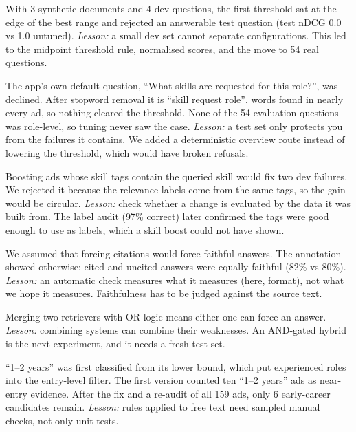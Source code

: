 \begin{description}[leftmargin=0pt]
  \item[Tuning on toy data overfits.] With 3 synthetic documents and 4 dev questions, the first threshold sat at the edge of the best range and rejected an answerable test question (test nDCG 0.0 vs 1.0 untuned). \emph{Lesson:} a small dev set cannot separate configurations. This led to the midpoint threshold rule, normalised scores, and the move to 54 real questions.
  \item[Generic questions were refused.] The app's own default question, ``What skills are requested for this role?'', was declined. After stopword removal it is ``skill request role'', words found in nearly every ad, so nothing cleared the threshold. None of the 54 evaluation questions was role-level, so tuning never saw the case. \emph{Lesson:} a test set only protects you from the failures it contains. We added a deterministic overview route instead of lowering the threshold, which would have broken refusals.
  \item[A fix that would have inflated our own scores.] Boosting ads whose skill tags contain the queried skill would fix two dev failures. We rejected it because the relevance labels come from the same tags, so the gain would be circular. \emph{Lesson:} check whether a change is evaluated by the data it was built from. The label audit (97\% correct) later confirmed the tags were good enough to use as labels, which a skill boost could not have shown.
  \item[A citation check that looked like a truth check.] We assumed that forcing citations would force faithful answers. The annotation showed otherwise: cited and uncited answers were equally faithful (82\% vs 80\%). \emph{Lesson:} an automatic check measures what it measures (here, format), not what we hope it measures. Faithfulness has to be judged against the source text.
  \item[Hybrid retrieval weakened refusal.] Merging two retrievers with OR logic means either one can force an answer. \emph{Lesson:} combining systems can combine their weaknesses. An AND-gated hybrid is the next experiment, and it needs a fresh test set.
  \item[The experience parser read ranges wrongly.] ``1--2 years'' was first classified from its lower bound, which put experienced roles into the entry-level filter. The first version counted ten ``1--2 years'' ads as near-entry evidence. After the fix and a re-audit of all 159 ads, only 6 early-career candidates remain. \emph{Lesson:} rules applied to free text need sampled manual checks, not only unit tests.
\end{description}
